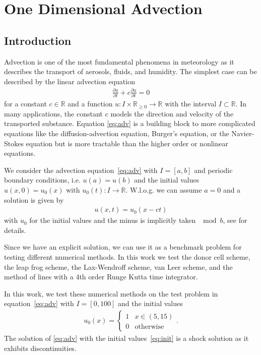\chapter{One Dimensional Advection}
\section{Introduction}
Advection is one of the most fundamental phenomena in meteorology as it describes the
transport of aerosols, fluids, and humidity. The simplest case can be described by the
linear advection equation
\begin{align}
    \label{eq:adv}
    \frac{\partial u}{\partial t} + c \frac{\partial u}{\partial t} = 0
\end{align}
for a constant $c\in\mathbb R$ and a function $u: I \times \mathbb R_{\geq 0} \to 
\mathbb{R}$ with the interval $I \subset \mathbb R$. In many applications, the constant 
$c$ models the direction and velocity of the transported substance. 
Equation \eqref{eq:adv} is a
building block to more complicated equations like the diffusion-advection equation, Burger's
equation, or the Navier-Stokes equation but is more tractable than the higher order or
nonlinear equations.

We consider the advection equation~\eqref{eq:adv} with $I = [a,b]$ and periodic boundary
conditions, i.e. $u(a) = u(b)$ and the initial values $u(x,0) = u_0(x)$ with $u_0(t): I \to \mathbb R$. W.l.o.g.
we can assume $a = 0$ and a solution is given by
\begin{align}
    u(x,t) = u_0(x - ct)
\end{align}
with $u_0$ for the initial values and the minus is implicitly taken $\mod b$, see
\cite{Evans2010} for details. 

Since we have an explicit solution, we can use it as a 
benchmark problem for testing different
numerical methods. In this work we test the donor cell scheme, the leap frog scheme,
the Lax-Wendroff scheme, van Leer scheme, and the method of lines with a 4th order
Runge Kutta time integrator. 

In this work, we test these numerical methods on the test problem in equation~\eqref{eq:adv}
with $I = [0, 100]$ and the initial values
\begin{align}
    \label{eq:init}
    u_0(x) = \begin{cases}
        1 & x \in (5,15) \\
        0 & \text{otherwise}
    \end{cases}.
\end{align}
The solution of \eqref{eq:adv} with the initial values~\eqref{eq:init} is a shock solution 
as it exhibits discontinuities.

